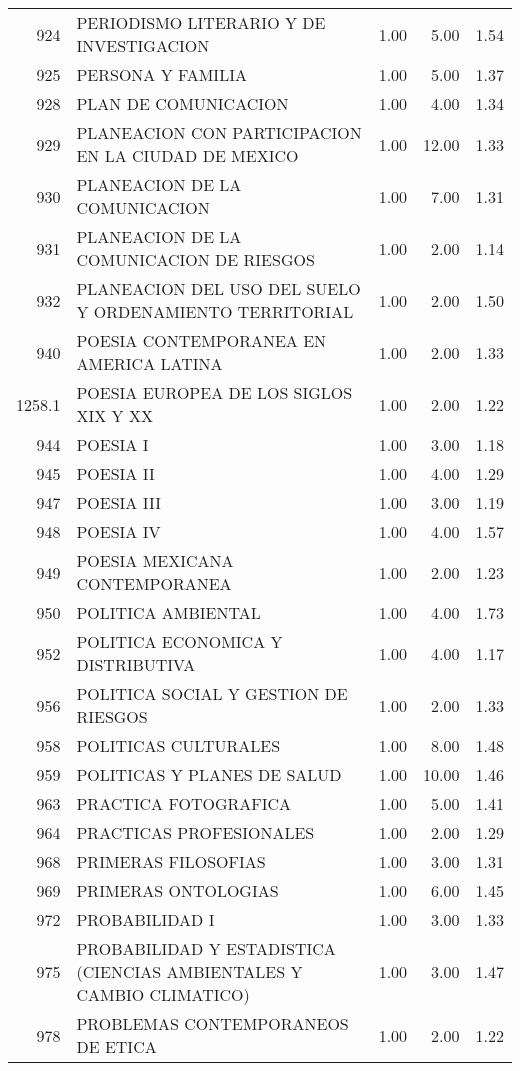 \begin{table}[ht]
\begin{tabular}{rlrrr}
  924 & PERIODISMO LITERARIO Y DE INVESTIGACION & 1.00 & 5.00 & 1.54 \\ 
  925 & PERSONA Y FAMILIA & 1.00 & 5.00 & 1.37 \\ 
  928 & PLAN DE COMUNICACION & 1.00 & 4.00 & 1.34 \\ 
  929 & PLANEACION CON PARTICIPACION EN LA CIUDAD DE MEXICO & 1.00 & 12.00 & 1.33 \\ 
  930 & PLANEACION DE LA COMUNICACION & 1.00 & 7.00 & 1.31 \\ 
  931 & PLANEACION DE LA COMUNICACION DE RIESGOS & 1.00 & 2.00 & 1.14 \\ 
  932 & PLANEACION DEL USO DEL SUELO Y ORDENAMIENTO TERRITORIAL & 1.00 & 2.00 & 1.50 \\ 
  940 & POESIA CONTEMPORANEA EN AMERICA LATINA & 1.00 & 2.00 & 1.33 \\ 
  1258.1 & POESIA EUROPEA DE LOS SIGLOS XIX Y XX & 1.00 & 2.00 & 1.22 \\ 
  944 & POESIA I & 1.00 & 3.00 & 1.18 \\ 
  945 & POESIA II & 1.00 & 4.00 & 1.29 \\ 
  947 & POESIA III & 1.00 & 3.00 & 1.19 \\ 
  948 & POESIA IV & 1.00 & 4.00 & 1.57 \\ 
  949 & POESIA MEXICANA CONTEMPORANEA & 1.00 & 2.00 & 1.23 \\ 
  950 & POLITICA AMBIENTAL & 1.00 & 4.00 & 1.73 \\ 
  952 & POLITICA ECONOMICA Y DISTRIBUTIVA & 1.00 & 4.00 & 1.17 \\ 
  956 & POLITICA SOCIAL Y GESTION DE RIESGOS & 1.00 & 2.00 & 1.33 \\ 
  958 & POLITICAS CULTURALES & 1.00 & 8.00 & 1.48 \\ 
  959 & POLITICAS Y PLANES DE SALUD & 1.00 & 10.00 & 1.46 \\ 
  963 & PRACTICA FOTOGRAFICA & 1.00 & 5.00 & 1.41 \\ 
  964 & PRACTICAS PROFESIONALES & 1.00 & 2.00 & 1.29 \\ 
  968 & PRIMERAS FILOSOFIAS & 1.00 & 3.00 & 1.31 \\ 
  969 & PRIMERAS ONTOLOGIAS & 1.00 & 6.00 & 1.45 \\ 
  972 & PROBABILIDAD I & 1.00 & 3.00 & 1.33 \\ 
  975 & PROBABILIDAD Y ESTADISTICA (CIENCIAS AMBIENTALES Y CAMBIO CLIMATICO) & 1.00 & 3.00 & 1.47 \\ 
  978 & PROBLEMAS CONTEMPORANEOS DE ETICA & 1.00 & 2.00 & 1.22 \\ 

\end{tabular}
\end{table}

